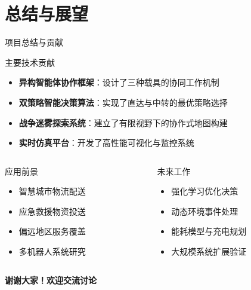 \documentclass[
10pt,
aspectratio=169,
]{beamer}
\begin{document}
\section{总结与展望}

\begin{frame}{项目总结与贡献}
    \begin{block}{主要技术贡献}
        \begin{itemize}
            \item \textbf{异构智能体协作框架}：设计了三种载具的协同工作机制
            \item \textbf{双策略智能决策算法}：实现了直达与中转的最优策略选择
            \item \textbf{战争迷雾探索系统}：建立了有限视野下的协作式地图构建
            \item \textbf{实时仿真平台}：开发了高性能可视化与监控系统
        \end{itemize}
    \end{block}
    
    \begin{columns}
        \begin{column}{0.5\textwidth}
            \begin{exampleblock}{应用前景}
                \begin{itemize}
                    \item 智慧城市物流配送
                    \item 应急救援物资投送
                    \item 偏远地区服务覆盖
                    \item 多机器人系统研究
                \end{itemize}
            \end{exampleblock}
        \end{column}
        \begin{column}{0.5\textwidth}
            \begin{alertblock}{未来工作}
                \begin{itemize}
                    \item 强化学习优化决策
                    \item 动态环境事件处理
                    \item 能耗模型与充电规划
                    \item 大规模系统扩展验证
                \end{itemize}
            \end{alertblock}
        \end{column}
    \end{columns}
    
    \begin{center}
        \Large \textbf{谢谢大家！欢迎交流讨论}
    \end{center}
\end{frame}
\end{document}
